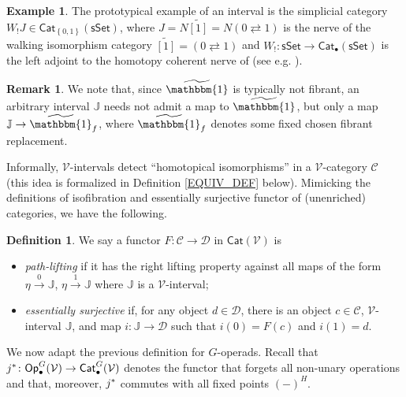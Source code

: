 \documentclass[a4paper,10pt
,draft
]{article}%
\numberwithin{equation}{section}
\numberwithin{figure}{section}
\theoremstyle{definition} %
\newtheorem{definition}[equation]{Definition}%
\newtheorem{example}[equation]{Example}%
\newtheorem{remark}[equation]{Remark}%
\newcommand{\set}[1]{\left\{#1\right\}}%
\newcommand{\sSet}{\ensuremath{\mathsf{sSet}}}%
\newcommand{\Cat}{\mathsf{Cat}}
\newcommand{\V}{\ensuremath{\mathcal V}}
\newcommand{\1}{\ensuremath{\mathbbm 1}}%
\begin{document}
\begin{example}
	The prototypical example of an interval is the simplicial category $W_!J \in \Cat_{\set{0,1}}(\sSet)$,
	where
	$J = N \widetilde{[1]} = N(0 \rightleftarrows 1) $ is the nerve of the walking isomorphism category 
	$\widetilde{[1]} =  (0 \rightleftarrows 1)$ and
	$W_! \colon \sSet \to \Cat_{\bullet}(\sSet)$ is the left adjoint to the homotopy coherent nerve
	of \cite{Cor82} (see e.g. \cite[\S 1]{Joy02}).
\end{example}



\begin{remark}
	We note that, since $\widetilde{\mathbbm{1}}$ is typically not fibrant,
	an arbitrary interval $\mathbb{J}$
	needs not admit a map to $\widetilde{\mathbbm{1}}$,
	but only a map $\mathbb{J} \to \widetilde{\mathbbm{1}}_f$,
	where $\widetilde{\mathbbm{1}}_f$ denotes some fixed chosen fibrant replacement.
\end{remark}



Informally, $\V$-intervals detect ``homotopical isomorphisms'' in a $\V$-category $\mathcal{C}$ 
(this idea is formalized in Definition \ref{EQUIV_DEF} below).
Mimicking the definitions of isofibration and essentially surjective functor of (unenriched) categories, we have the following.



\begin{definition}\label{PL_ES_DEFN}
We say a functor $F: \mathcal C \to \mathcal D$ in $\Cat(\V)$ is
\begin{itemize}
\item \textit{path-lifting}
	if it has the right lifting property against all maps of the form
	$\eta \xrightarrow{0} \mathbb{J}$, $\eta \xrightarrow{1} \mathbb{J}$
	where $\mathbb{J}$ is a $\V$-interval;
\item \textit{essentially surjective} 
	if, for any object $d \in \mathcal{D}$,
	there is an object $c \in \mathcal{C}$,
	$\V$-interval $\mathbb{J}$,
	and map $i \colon \mathbb{J} \to \mathcal D$
	such that $i(0) = F(c)$ and $i(1)=d$.
      \end{itemize}
\end{definition}



We now adapt the previous definition for $G$-operads.
Recall that $j^{\**} \colon \mathsf{Op}^G_\bullet(\V) \to \mathsf{Cat}^G_{\bullet}(\V)$
denotes the functor that forgets all non-unary operations and that, moreover, 
$j^{\**}$ commutes with all fixed points $(-)^H$.
\end{document}
